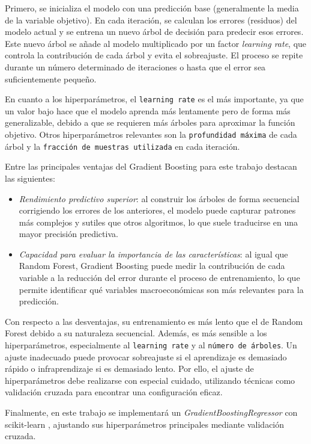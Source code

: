 Primero, se inicializa el modelo con una predicción base (generalmente la media de la variable objetivo). En cada iteración, se calculan los errores (residuos) del modelo actual y se entrena un nuevo árbol de decisión para predecir esos errores. Este nuevo árbol se añade al modelo multiplicado por un factor \textit{learning rate}, que controla la contribución de cada árbol y evita el sobreajuste. El proceso se repite durante un número determinado de iteraciones o hasta que el error sea suficientemente pequeño.

En cuanto a los hiperparámetros, el \texttt{learning rate} es el más importante, ya que un valor bajo hace que el modelo aprenda más lentamente pero de forma más generalizable, debido a que se requieren más árboles para aproximar la función objetivo. Otros hiperparámetros relevantes son la \texttt{profundidad máxima} de cada árbol y la \texttt{fracción de muestras utilizada} en cada iteración.

Entre las principales ventajas del Gradient Boosting para este trabajo destacan las siguientes:

\begin{itemize}
    \item \emph{Rendimiento predictivo superior}: al construir los árboles de forma secuencial corrigiendo los errores de los anteriores, el modelo puede capturar patrones más complejos y sutiles que otros algoritmos, lo que suele traducirse en una mayor precisión predictiva.
    \item \emph{Capacidad para evaluar la importancia de las características}: al igual que Random Forest, Gradient Boosting puede medir la contribución de cada variable a la reducción del error durante el proceso de entrenamiento, lo que permite identificar qué variables macroeconómicas son más relevantes para la predicción.
\end{itemize}

Con respecto a las desventajas, su entrenamiento es más lento que el de Random Forest debido a su naturaleza secuencial. Además, es más sensible a los hiperparámetros, especialmente al \texttt{learning rate} y al \texttt{número de árboles}. Un ajuste inadecuado puede provocar sobreajuste si el aprendizaje es demasiado rápido o infraprendizaje si es demasiado lento. Por ello, el ajuste de hiperparámetros debe realizarse con especial cuidado, utilizando técnicas como validación cruzada para encontrar una configuración eficaz.

Finalmente, en este trabajo se implementará un \textit{GradientBoostingRegressor} con scikit-learn \cite{scikit_gb}, ajustando sus hiperparámetros principales mediante validación cruzada.

